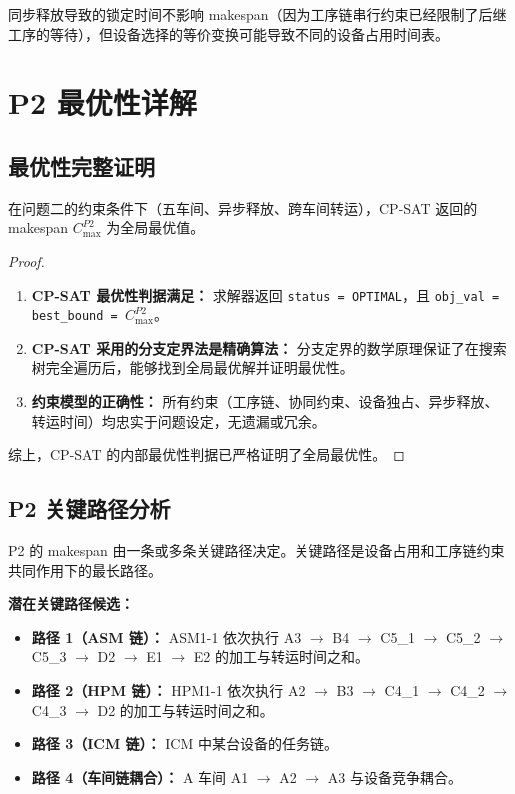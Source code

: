 \documentclass[UTF8,a4paper,12pt]{ctexart}
\begin{document}
同步释放导致的锁定时间不影响 makespan（因为工序链串行约束已经限制了后继工序的等待），但设备选择的等价变换可能导致不同的设备占用时间表。

\section{P2 最优性详解}
\subsection{最优性完整证明}
\begin{theorem}[P2 最优性]
在问题二的约束条件下（五车间、异步释放、跨车间转运），CP-SAT 返回的 makespan $C_{\max}^{P2}$ 为全局最优值。
\end{theorem}

\begin{proof}
\begin{enumerate}
  \item \textbf{CP-SAT 最优性判据满足：} 求解器返回 \texttt{status = OPTIMAL}，且 \texttt{obj\_val = best\_bound = $C_{\max}^{P2}$}。
  \item \textbf{CP-SAT 采用的分支定界法是精确算法：} 分支定界的数学原理保证了在搜索树完全遍历后，能够找到全局最优解并证明最优性。
  \item \textbf{约束模型的正确性：} 所有约束（工序链、协同约束、设备独占、异步释放、转运时间）均忠实于问题设定，无遗漏或冗余。
\end{enumerate}
综上，CP-SAT 的内部最优性判据已严格证明了全局最优性。
\end{proof}

\subsection{P2 关键路径分析}
P2 的 makespan 由一条或多条关键路径决定。关键路径是设备占用和工序链约束共同作用下的最长路径。

\textbf{潜在关键路径候选：}
\begin{itemize}
  \item \textbf{路径 1（ASM 链）：} ASM1-1 依次执行 A3 $\to$ B4 $\to$ C5\_1 $\to$ C5\_2 $\to$ C5\_3 $\to$ D2 $\to$ E1 $\to$ E2 的加工与转运时间之和。
  \item \textbf{路径 2（HPM 链）：} HPM1-1 依次执行 A2 $\to$ B3 $\to$ C4\_1 $\to$ C4\_2 $\to$ C4\_3 $\to$ D2 的加工与转运时间之和。
  \item \textbf{路径 3（ICM 链）：} ICM 中某台设备的任务链。
  \item \textbf{路径 4（车间链耦合）：} A 车间 A1 $\to$ A2 $\to$ A3 与设备竞争耦合。
\end{itemize}
\end{document}
